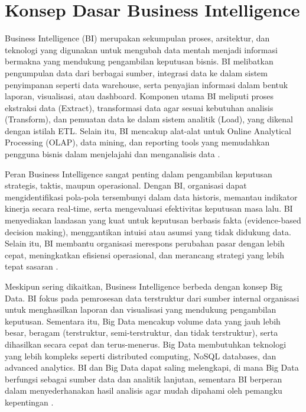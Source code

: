 \section{Konsep Dasar Business Intelligence}

Business Intelligence (BI) merupakan sekumpulan proses, arsitektur, dan teknologi yang digunakan untuk mengubah data mentah menjadi informasi bermakna yang mendukung pengambilan keputusan bisnis. BI melibatkan pengumpulan data dari berbagai sumber, integrasi data ke dalam sistem penyimpanan seperti data warehouse, serta penyajian informasi dalam bentuk laporan, visualisasi, atau dashboard. Komponen utama BI meliputi proses ekstraksi data (Extract), transformasi data agar sesuai kebutuhan analisis (Transform), dan pemuatan data ke dalam sistem analitik (Load), yang dikenal dengan istilah ETL. Selain itu, BI mencakup alat-alat untuk Online Analytical Processing (OLAP), data mining, dan reporting tools yang memudahkan pengguna bisnis dalam menjelajahi dan menganalisis data \cite{raj2018business}.

Peran Business Intelligence sangat penting dalam pengambilan keputusan strategis, taktis, maupun operasional. Dengan BI, organisasi dapat mengidentifikasi pola-pola tersembunyi dalam data historis, memantau indikator kinerja secara real-time, serta mengevaluasi efektivitas keputusan masa lalu. BI menyediakan landasan yang kuat untuk keputusan berbasis fakta (evidence-based decision making), menggantikan intuisi atau asumsi yang tidak didukung data. Selain itu, BI membantu organisasi merespons perubahan pasar dengan lebih cepat, meningkatkan efisiensi operasional, dan merancang strategi yang lebih tepat sasaran \cite{petrini2004measuring}.

Meskipun sering dikaitkan, Business Intelligence berbeda dengan konsep Big Data. BI fokus pada pemrosesan data terstruktur dari sumber internal organisasi untuk menghasilkan laporan dan visualisasi yang mendukung pengambilan keputusan. Sementara itu, Big Data mencakup volume data yang jauh lebih besar, beragam (terstruktur, semi-terstruktur, dan tidak terstruktur), serta dihasilkan secara cepat dan terus-menerus. Big Data membutuhkan teknologi yang lebih kompleks seperti distributed computing, NoSQL databases, dan advanced analytics. BI dan Big Data dapat saling melengkapi, di mana Big Data berfungsi sebagai sumber data dan analitik lanjutan, sementara BI berperan dalam menyederhanakan hasil analisis agar mudah dipahami oleh pemangku kepentingan \cite{mukherjee2022comparative}.


